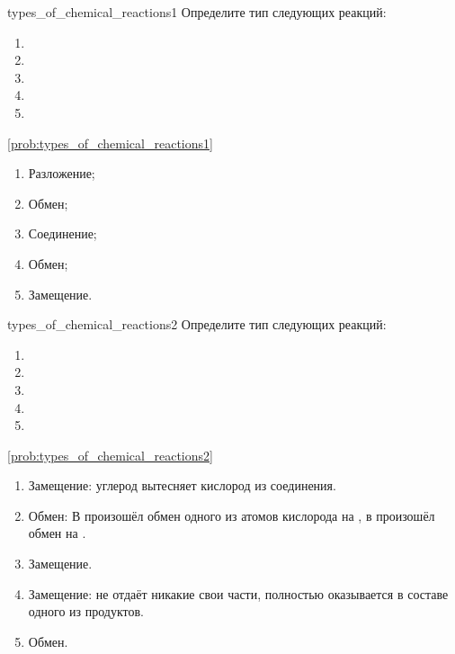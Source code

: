 \begin{problem}{}{types_of_chemical_reactions1}
    Определите тип следующих реакций:
    \begin{enumerate}[label=\arabic*)]
        \item {}
        \item {}
        \item {}
        \item {}
        \item {}
    \end{enumerate}
    \begin{sol}{\ref{prob:types_of_chemical_reactions1}}
        \begin{enumerate}[label=\arabic*)]
            \item Разложение;
            \item Обмен;
            \item Соединение;
            \item Обмен;
            \item Замещение.
        \end{enumerate}
    \end{sol}
\end{problem}

\begin{problem}{}{types_of_chemical_reactions2}
    Определите тип следующих реакций:
    \begin{enumerate}[label=\arabic*)]
        \item {}
        \item {}
        \item {}
        \item {}
        \item {}
    \end{enumerate}
    \begin{sol}{\ref{prob:types_of_chemical_reactions2}}
        \begin{enumerate}[label=\arabic*)]
            \item Замещение: углерод вытесняет кислород из соединения.
            \item Обмен: В  произошёл обмен одного из атомов кислорода на , в  произошёл обмен  на .
            \item Замещение.
            \item Замещение:  не отдаёт никакие свои части, полностью оказывается в составе одного из продуктов.
            \item Обмен.
        \end{enumerate}
    \end{sol}
\end{problem}

